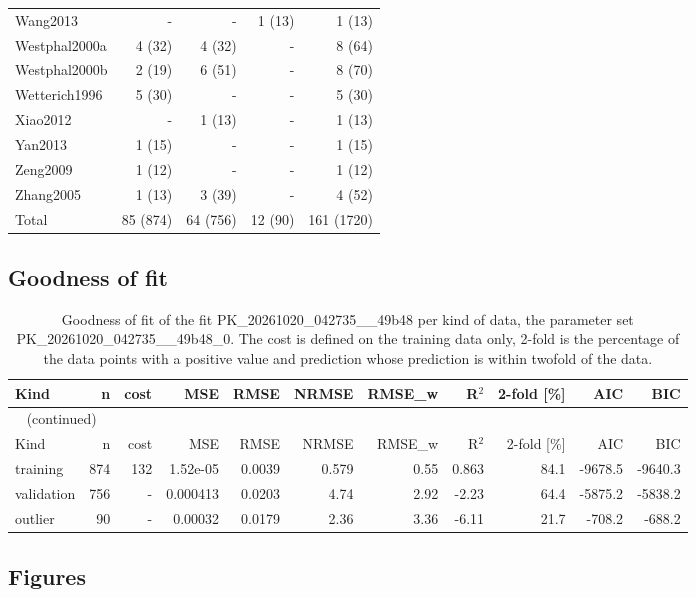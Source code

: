 \documentclass{article}
\begin{document}
\begin{longtable}{lrrrr}
Wang2013 & - & - & 1 (13) & 1 (13) \\
Westphal2000a & 4 (32) & 4 (32) & - & 8 (64) \\
Westphal2000b & 2 (19) & 6 (51) & - & 8 (70) \\
Wetterich1996 & 5 (30) & - & - & 5 (30) \\
Xiao2012 & - & 1 (13) & - & 1 (13) \\
Yan2013 & 1 (15) & - & - & 1 (15) \\
Zeng2009 & 1 (12) & - & - & 1 (12) \\
Zhang2005 & 1 (13) & 3 (39) & - & 4 (52) \\
Total & 85 (874) & 64 (756) & 12 (90) & 161 (1720) \\
\end{longtable}

\subsection{Goodness of fit}

\begin{longtable}{lrrrrrrrrrr}
\caption{Goodness of fit of the fit PK\_20261020\_042735\_\_49b48 per kind of data, the parameter set PK\_20261020\_042735\_\_49b48\_0. The cost is defined on the training data only, 2-fold is the percentage of the data points with a positive value and prediction whose prediction is within twofold of the data.}\label{tab:metrics:PK_20261020_042735__49b48} \\
\toprule
Kind & n & cost & MSE & RMSE & NRMSE & RMSE\_w & R\ensuremath{^{2}} & 2-fold [\%] & AIC & BIC \\
\midrule
\endfirsthead
\multicolumn{11}{l}{\small\tablename~\thetable{} (continued)} \\
\toprule
Kind & n & cost & MSE & RMSE & NRMSE & RMSE\_w & R\ensuremath{^{2}} & 2-fold [\%] & AIC & BIC \\
\midrule
\endhead
\bottomrule
\endlastfoot
training & 874 & 132 & 1.52e-05 & 0.0039 & 0.579 & 0.55 & 0.863 & 84.1 & -9678.5 & -9640.3 \\
validation & 756 & - & 0.000413 & 0.0203 & 4.74 & 2.92 & -2.23 & 64.4 & -5875.2 & -5838.2 \\
outlier & 90 & - & 0.00032 & 0.0179 & 2.36 & 3.36 & -6.11 & 21.7 & -708.2 & -688.2 \\
\end{longtable}

\subsection{Figures}
\end{document}
